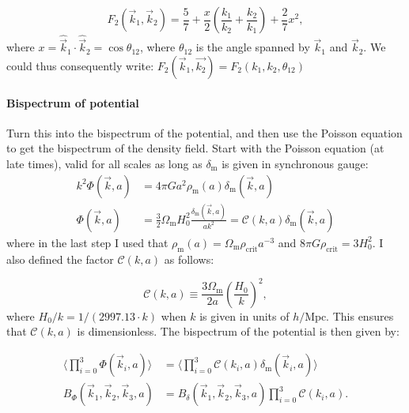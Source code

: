         \begin{equation}
            F_2(\vec{k}_1,\vec{k}_2) = \frac{5}{7} + \frac{x}{2}\left(\frac{k_1}{k_2}+\frac{k_2}{k_1}\right) + \frac{2}{7}x^2,
        \end{equation}
        where $x = \hat{\vec{k}}_1 \cdot \hat{\vec{k}}_2 = \cos{\theta_{12}}$, where $\theta_{12}$ is the angle spanned by $\vec{k}_1$ and $\vec{k}_2$. We could thus consequently write: $F_2(\vec{k}_1,\vec{k_2}) = F_2(k_1,k_2,\theta_{12})$ 

        \paragraph{Bispectrum of potential}
            Turn this into the bispectrum of the potential, and then use the Poisson equation to get the bispectrum of the density field. Start with the Poisson equation (at late times), valid for all scales as long as $\delta_\mathrm{m}$ is given in synchronous gauge:
            \begin{equation}
                \begin{split}
                    k^2\Phi(\vec{k},a) &= 4\pi G a^2 \rho_\mathrm{m}(a) \delta_\mathrm{m}(\vec{k},a)\\
                    \Phi(\vec{k}, a) &= \frac{3}{2}\Omega_\mathrm{m} H_0^2 \frac{\delta_\mathrm{m}(\vec{k},a)}{ak^2} = \mathcal{C}(k,a)\delta_\mathrm{m}(\vec{k},a)
                \end{split}
            \end{equation}
            where in the last step I used that $\rho_\mathrm{m}(a) = \Omega_\mathrm{m} \rho_\mathrm{crit} a^{-3}$ and $8\pi G \rho_\mathrm{crit} = 3H_0^2$. I also defined the factor $\mathcal{C}(k, a)$ as follows:
        
            \begin{equation}
                \mathcal{C}(k,a) \equiv \frac{3\Omega_\mathrm{m}}{2a}\left(\frac{H_0}{k}\right)^2,
            \end{equation}
            where $H_0/k=1/(2997.13\cdot k)$ when $k$ is given in units of $h/\mathrm{Mpc}$.  This ensures that $\mathcal{C}(k,a)$ is dimensionless. The bispectrum of the potential is then given by:

            \begin{equation}
                \begin{split}
                    \langle \prod_{i=0}^3\Phi(\vec{k}_i,a) \rangle &= \langle \prod_{i=0}^3\mathcal{C}(k_i,a)\delta_\mathrm{m}(\vec{k}_i,a) \rangle \\
                    B_\Phi(\vec{k}_1,\vec{k}_2,\vec{k}_3, a) &=  B_\delta(\vec{k}_1,\vec{k}_2,\vec{k}_3, a) \prod_{i=0}^3\mathcal{C}(k_i,a). 
                \end{split}
            \end{equation}

